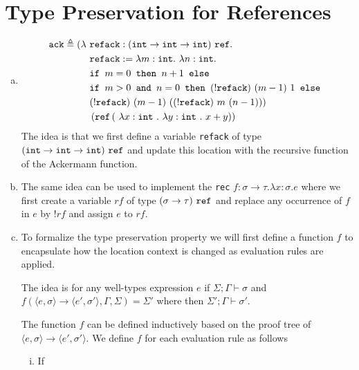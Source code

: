 \section{Type Preservation for References}

\begin{enumerate}[(a)]
\item
\begin{align*}
\texttt{ack} \triangleq ( \lambda ~ &\texttt{refack}:(\texttt{int} \rightarrow \texttt{int} \rightarrow \texttt{int}) ~ \texttt{ref} .\\
&\texttt{refack} := \lambda m : \texttt{int}. ~ \lambda n : \texttt{int} . ~ \\
&\texttt{if } m = 0 \texttt{ then } n+1 \texttt{ else}\\
&\texttt{if } m>0 \texttt{ and } n = 0 \texttt{ then } (!\texttt{refack}) ~ (m-1) ~1 \texttt{ else } \\
&(!\texttt{refack}) ~ (m-1) ~ ((!\texttt{refack}) ~ m ~ (n-1)) ) \\
&\left ( \texttt{ref} \left ( ~ \lambda x : \texttt{int}~.~\lambda y : \texttt{int}~.~ x+ y \right ) \right )
\end{align*}
The idea is that we first define a variable \texttt{refack} of type $(\texttt{int} \rightarrow \texttt{int} \rightarrow \texttt{int}) ~ \texttt{ref}$ and update this location with the recursive function of the Ackermann function.
\item The same idea can be used to implement the \texttt{rec} $f : \sigma \rightarrow \tau.\lambda x : \sigma.e$ where we first create a variable $rf$ of type $(\sigma \rightarrow \tau)~\texttt{ref}$ and replace any occurrence of $f$ in $e$ by $!rf$ and assign $e$ to $rf$.
\item To formalize the type preservation property we will first define a function $f$ to encapsulate how the location context is changed as evaluation rules are applied. 

The idea is for any well-types expression $e$ if $\Sigma; \Gamma \vdash \sigma$ and $f(
  \langle e, \sigma \rangle \rightarrow \langle e', \sigma' \rangle,
  \Gamma, 
  \Sigma) = \Sigma'$ where then $\Sigma'; \Gamma \vdash \sigma'$. 

The function $f$ can be defined inductively based on the proof tree of $\langle e, \sigma \rangle \rightarrow \langle e', \sigma' \rangle$. We define $f$ for each evaluation rule as follows
\begin{enumerate}[i.]
\item If 


\end{enumerate}
\end{enumerate}

